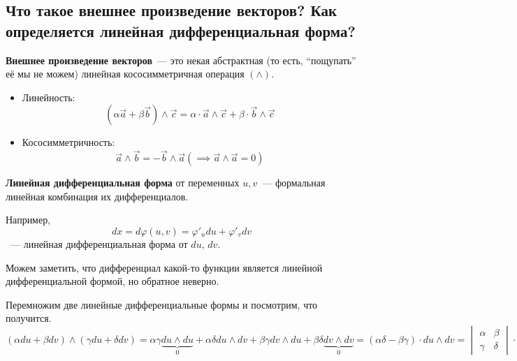 
\subsection{Что такое внешнее произведение векторов? Как определяется линейная дифференциальная форма?}

\textbf{Внешнее произведение векторов}~--- это некая абстрактная (то есть, ``пощупать'' её мы не можем) линейная кососимметричная операция $(\wedge)$.
\begin{itemize}
    \item Линейность:
    \begin{equation*}
        (\alpha\vec{a} + \beta\vec{b}) \wedge \vec{c} = \alpha \cdot \vec{a} \wedge \vec{c} + \beta \cdot \vec{b} \wedge \vec{c}
    \end{equation*}
    \item Кососимметричность:
    \begin{equation*}
        \vec{a} \wedge \vec{b} = -\vec{b} \wedge \vec{a} (\implies \vec{a} \wedge \vec{a} = 0)
    \end{equation*}       
\end{itemize}

\textbf{Линейная дифференциальная форма} от переменных $u, v$~--- формальная линейная комбинация их дифференциалов.

Например,
\begin{equation*}
    dx = d\varphi(u, v) = \varphi'_udu + \varphi'_vdv
\end{equation*}
~--- линейная дифференциальная форма от $du$, $dv$. 

Можем заметить, что дифференциал какой-то функции является линейной дифференциальной формой, но обратное неверно.

\begin{example}
    Перемножим две линейные дифференциальные формы и посмотрим, что получится.
    \begin{equation*}
        (\alpha du + \beta dv) \wedge (\gamma du + \delta dv) = \alpha \gamma \underbrace{du \wedge du}_0 + \alpha \delta du \wedge dv + \beta \gamma dv \wedge du + \beta \delta \underbrace{dv \wedge dv}_0 = (\alpha \delta - \beta \gamma) \cdot du \wedge dv = \begin{vmatrix}
            \alpha & \beta\\
            \gamma & \delta
        \end{vmatrix} \cdot du \wedge dv
    \end{equation*}
\end{example}